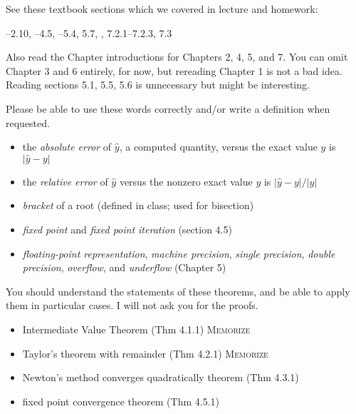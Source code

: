 \documentclass[12pt]{amsart}
\begin{document}
 See these textbook sections which we covered in lecture and homework:

--2.10, --4.5, --5.4, 5.7, , 7.2.1--7.2.3, 7.3

\noindent Also read the Chapter introductions for Chapters 2, 4, 5, and 7.  You can omit Chapter 3 and 6 entirely, for now, but rereading Chapter 1 is not a bad idea.  Reading sections 5.1, 5.5, 5.6 is unnecessary but might be interesting.

  Please be able to use these words correctly and/or write a definition when requested.
  \begin{itemize}
  \item  the \emph{absolute error} of $\hat y$, a computed quantity, versus the exact value $y$ is $|\hat y - y|$
  \item  the \emph{relative error} of $\hat y$ versus the nonzero exact value $y$ is $|\hat y - y|/|y|$  
  \item  \emph{bracket} of a root (defined in class; used for bisection)
  \item  \emph{fixed point} and \emph{fixed point iteration}  (section 4.5)
  \item  \emph{floating-point representation}, \emph{machine precision}, \emph{single precision}, \emph{double precision}, \emph{overflow}, and \emph{underflow}  (Chapter 5)
  \end{itemize}

\clearpage\newpage
{}  You should understand the statements of these theorems, and be able to apply them in particular cases.  I will not ask you for the proofs.
  \begin{itemize}
  \item  Intermediate Value Theorem (Thm 4.1.1) \qquad  \textsc{Memorize}
  \item  Taylor's theorem with remainder (Thm 4.2.1) \qquad  \textsc{Memorize}
  \item  Newton's method converges quadratically theorem (Thm 4.3.1)
  \item  fixed point convergence theorem (Thm 4.5.1)
  \end{itemize}
\end{document}

